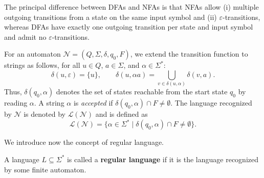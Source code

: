 The principal difference between DFAs and NFAs is that NFAs allow (i) multiple outgoing transitions from a state on the same input symbol and (ii) $\varepsilon$-transitions, whereas DFAs have exactly one outgoing transition per state and input symbol and admit no $\varepsilon$-transitions.

For an automaton $\mathcal{N}=(Q,\Sigma,\delta,q_0,F)$, we extend the transition function to strings as follows, for all $u \in Q$, $a \in \Sigma$, and $\alpha \in \Sigma^*$:
\[
\delta(u,\varepsilon)=\{u\}, \qquad
\delta(u,\alpha a)=\bigcup_{v \in \delta(u,\alpha)} \delta(v,a).
\]
Thus, $\delta(q_0,\alpha)$ denotes the set of states reachable from the start state $q_0$ by reading $\alpha$. A string $\alpha$ is \emph{accepted} if $\delta(q_0,\alpha)\cap F \neq \emptyset$. The language recognized by $\mathcal{N}$ is denoted by $\mathcal{L}(\mathcal{N})$ and is defined as
\[
\mathcal{L}(\mathcal{N})=\{\alpha \in \Sigma^* \mid \delta(q_0,\alpha)\cap F \neq \emptyset\}.
\]

We introduce now the concept of regular language.
\begin{definition}
A language $L \subseteq \Sigma^*$ is called a \textbf{regular language} if it is the language recognized by some finite automaton.
\end{definition}
